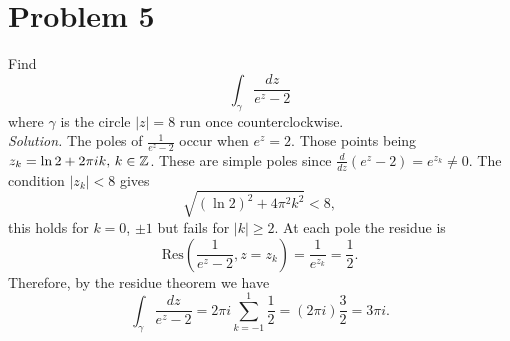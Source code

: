 \documentclass[12pt]{article}
\begin{document}
\section*{Problem 5}
Find 
\[
    \int_{\gamma}\frac{dz}{e^z-2}
\]
where $\gamma$ is the circle $|z|=8$ run once counterclockwise.\\
\textit{Solution.} The poles of $\frac{1}{e^z-2}$ occur when $e^z=2$. Those points being $z_k=\ln2+2\pi ik,\,k\in\mathbb{Z}$. These are simple poles since $\frac{d}{dz}(e^z-2)=e^{z_k}\neq0$. The condition $|z_k|<8$ gives
\[
    \sqrt{(\ln2)^2+4\pi^2k^2}<8,
\]
this holds for $k = 0$, $\pm1$ but fails for $|k|\geq2$. At each pole the residue is
\[
    \mathrm{Res}\left(\frac{1}{e^z-2},z=z_k\right)=\frac{1}{e^{z_k}}=\frac{1}{2}.
\]
Therefore, by the residue theorem we have
\[
    \int_{\gamma}\frac{dz}{e^z-2}=2\pi i\sum_{k=-1}^{1}\frac{1}{2}=(2\pi i)\frac{3}{2}=3\pi i.
\]
\end{document}
